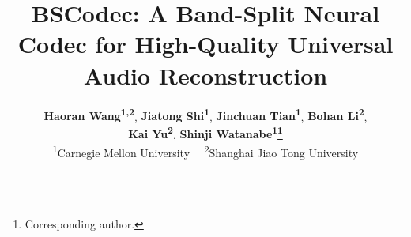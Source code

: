 \documentclass[11pt]{article}
\title{BSCodec: A Band-Split Neural Codec for High-Quality Universal Audio Reconstruction}
\author{
 \textbf{Haoran Wang\textsuperscript{1,2}},
 \textbf{Jiatong Shi\textsuperscript{1}},
 \textbf{Jinchuan Tian\textsuperscript{1}},
 \textbf{Bohan Li\textsuperscript{2}},
\\
 \textbf{Kai Yu\textsuperscript{2}},
 \textbf{Shinji Watanabe\textsuperscript{1}\thanks{Corresponding author.}}
\\
 \textsuperscript{1}Carnegie Mellon University~~
 \textsuperscript{2}Shanghai Jiao Tong University
\\
}
\begin{document}
\maketitle
\begin{abstract}




\end{abstract}
\end{document}

